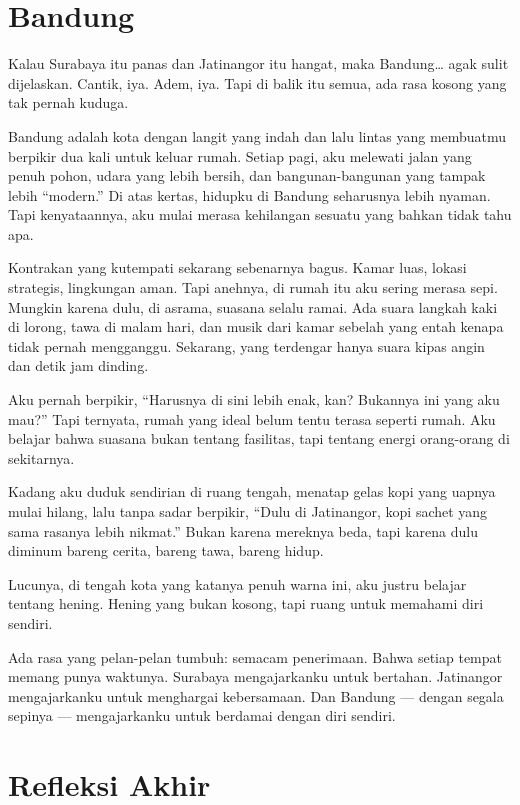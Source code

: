 \documentclass[
  letterpaper,
  DIV=11,
  numbers=noendperiod]{scrreprt}
\begin{document}
\section{Bandung}\label{bandung}

Kalau Surabaya itu panas dan Jatinangor itu hangat, maka Bandung\ldots{}
agak sulit dijelaskan. Cantik, iya. Adem, iya. Tapi di balik itu semua,
ada rasa kosong yang tak pernah kuduga.

Bandung adalah kota dengan langit yang indah dan lalu lintas yang
membuatmu berpikir dua kali untuk keluar rumah. Setiap pagi, aku
melewati jalan yang penuh pohon, udara yang lebih bersih, dan
bangunan-bangunan yang tampak lebih ``modern.'' Di atas kertas, hidupku
di Bandung seharusnya lebih nyaman. Tapi kenyataannya, aku mulai merasa
kehilangan sesuatu yang bahkan tidak tahu apa.

Kontrakan yang kutempati sekarang sebenarnya bagus. Kamar luas, lokasi
strategis, lingkungan aman. Tapi anehnya, di rumah itu aku sering merasa
sepi. Mungkin karena dulu, di asrama, suasana selalu ramai. Ada suara
langkah kaki di lorong, tawa di malam hari, dan musik dari kamar sebelah
yang entah kenapa tidak pernah mengganggu. Sekarang, yang terdengar
hanya suara kipas angin dan detik jam dinding.

Aku pernah berpikir, ``Harusnya di sini lebih enak, kan? Bukannya ini
yang aku mau?'' Tapi ternyata, rumah yang ideal belum tentu terasa
seperti rumah. Aku belajar bahwa suasana bukan tentang fasilitas, tapi
tentang energi orang-orang di sekitarnya.

Kadang aku duduk sendirian di ruang tengah, menatap gelas kopi yang
uapnya mulai hilang, lalu tanpa sadar berpikir, ``Dulu di Jatinangor,
kopi sachet yang sama rasanya lebih nikmat.'' Bukan karena mereknya
beda, tapi karena dulu diminum bareng cerita, bareng tawa, bareng hidup.

Lucunya, di tengah kota yang katanya penuh warna ini, aku justru belajar
tentang hening. Hening yang bukan kosong, tapi ruang untuk memahami diri
sendiri.

Ada rasa yang pelan-pelan tumbuh: semacam penerimaan. Bahwa setiap
tempat memang punya waktunya. Surabaya mengajarkanku untuk bertahan.
Jatinangor mengajarkanku untuk menghargai kebersamaan. Dan Bandung ---
dengan segala sepinya --- mengajarkanku untuk berdamai dengan diri
sendiri.

\section{Refleksi Akhir}\label{refleksi-akhir}
\end{document}

